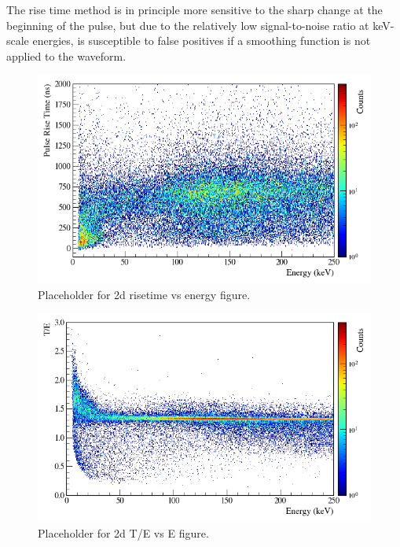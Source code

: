 \documentclass[nofootinbib,superscriptaddress, aps, prc, 
10pt, amsmath, amssymb, bibnotes,
altaffilletter, twocolumn, floatfix]{revtex4-2}
\begin{document}
    The rise time method is in principle more sensitive to the sharp change at the beginning of the pulse, but due to the relatively low signal-to-noise ratio at keV-scale energies, is susceptible to false positives if a smoothing function is not applied to the waveform.

    \begin{figure}
        \includegraphics[width=\columnwidth]{risetimes.png}
        \caption{Placeholder for 2d risetime vs energy figure.}
        \label{fig:risetimes}
    \end{figure}
    
    \begin{figure}
        \includegraphics[width=\columnwidth]{trianglefilt.png}
        \caption{Placeholder for 2d T/E vs E figure.}
        \label{fig:toe}
    \end{figure}
    
\end{document}
